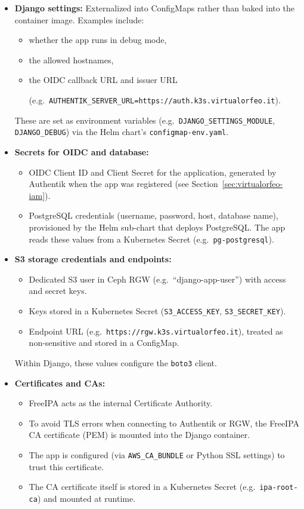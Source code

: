 \begin{itemize}
	\item \textbf{Django settings:}  
	Externalized into ConfigMaps rather than baked into the container image.  
	Examples include:  
	\begin{itemize}
		\item whether the app runs in debug mode,  
		\item the allowed hostnames,  
		\item the OIDC callback URL and issuer URL
		
		(e.g.\ \texttt{AUTHENTIK\_SERVER\_URL=https://auth.k3s.virtualorfeo.it}).  
	\end{itemize}  
	These are set as environment variables (e.g.\ \texttt{DJANGO\_SETTINGS\_MODULE}, \texttt{DJANGO\_DEBUG}) via the Helm chart’s \texttt{configmap-env.yaml}.
	
	\item \textbf{Secrets for OIDC and database:}  
	\begin{itemize}
		\item OIDC Client ID and Client Secret for the application, generated by Authentik when the app was registered (see Section~\ref{sec:virtualorfeo-iam}).  
		\item PostgreSQL credentials (username, password, host, database name), provisioned by the Helm sub-chart that deploys PostgreSQL. The app reads these values from a Kubernetes Secret (e.g.\ \texttt{pg-postgresql}).  
	\end{itemize}  
	
	\item \textbf{S3 storage credentials and endpoints:}  
	\begin{itemize}
		\item Dedicated S3 user in Ceph RGW (e.g.\ ``django-app-user'') with access and secret keys.  
		\item Keys stored in a Kubernetes Secret (\texttt{S3\_ACCESS\_KEY}, \texttt{S3\_SECRET\_KEY}).  
		\item Endpoint URL (e.g.\ \texttt{https://rgw.k3s.virtualorfeo.it}), treated as non-sensitive and stored in a ConfigMap.  
	\end{itemize}  
	Within Django, these values configure the \texttt{boto3} client.  
	
	\item \textbf{Certificates and CAs:}  
	\begin{itemize}
		\item FreeIPA acts as the internal Certificate Authority.  
		\item To avoid TLS errors when connecting to Authentik or RGW, the FreeIPA CA certificate (PEM) is mounted into the Django container.  
		\item The app is configured (via \texttt{AWS\_CA\_BUNDLE} or Python SSL settings) to trust this certificate.  
		\item The CA certificate itself is stored in a Kubernetes Secret (e.g.\ \texttt{ipa-root-ca}) and mounted at runtime.  
	\end{itemize}  
	

\end{itemize}
